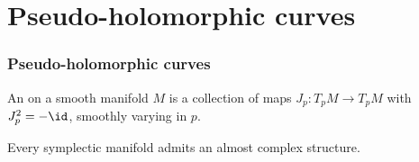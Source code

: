 \section{Pseudo-holomorphic curves}
\begin{frame}
  \frametitle{Pseudo-holomorphic curves}
  \begin{definition}
    An  on a smooth manifold $M$ is a collection of maps $J_p\colon T_pM\to T_pM$ with $J_p^2=-\id$, smoothly varying in $p$.
  \end{definition}
  \begin{theorem}
    Every symplectic manifold admits an almost complex structure.
  \end{theorem}
\end{frame}

